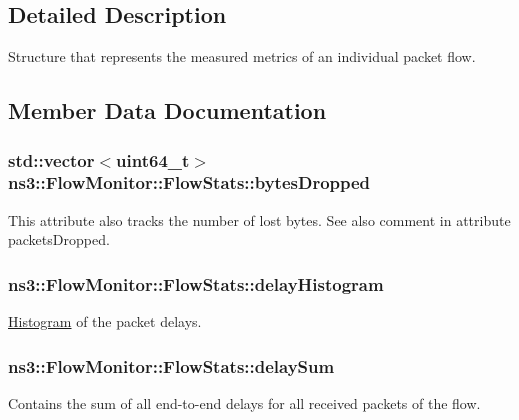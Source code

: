 \subsection{Detailed Description}
Structure that represents the measured metrics of an individual packet flow. 

\subsection{Member Data Documentation}
\subsubsection[{\texorpdfstring{bytes\+Dropped}{bytesDropped}}]{\setlength{\rightskip}{0pt plus 5cm}std\+::vector$<$uint64\+\_\+t$>$ ns3\+::\+Flow\+Monitor\+::\+Flow\+Stats\+::bytes\+Dropped}\hypertarget{structns3_1_1FlowMonitor_1_1FlowStats_af2ed6ff9bc23f2324c7400666ceec473}{}\label{structns3_1_1FlowMonitor_1_1FlowStats_af2ed6ff9bc23f2324c7400666ceec473}
This attribute also tracks the number of lost bytes. See also comment in attribute packets\+Dropped. 
\subsubsection[{\texorpdfstring{delay\+Histogram}{delayHistogram}}]{ ns3\+::\+Flow\+Monitor\+::\+Flow\+Stats\+::delay\+Histogram}\hypertarget{structns3_1_1FlowMonitor_1_1FlowStats_ad3db58889eb761a48e3ca0a798b5188b}{}\label{structns3_1_1FlowMonitor_1_1FlowStats_ad3db58889eb761a48e3ca0a798b5188b}


\hyperlink{classns3_1_1Histogram}{Histogram} of the packet delays. 

\subsubsection[{\texorpdfstring{delay\+Sum}{delaySum}}]{ ns3\+::\+Flow\+Monitor\+::\+Flow\+Stats\+::delay\+Sum}\hypertarget{structns3_1_1FlowMonitor_1_1FlowStats_ab1bf26cc10f8a0bb4a549d4d47188d15}{}\label{structns3_1_1FlowMonitor_1_1FlowStats_ab1bf26cc10f8a0bb4a549d4d47188d15}
Contains the sum of all end-\/to-\/end delays for all received packets of the flow. 
